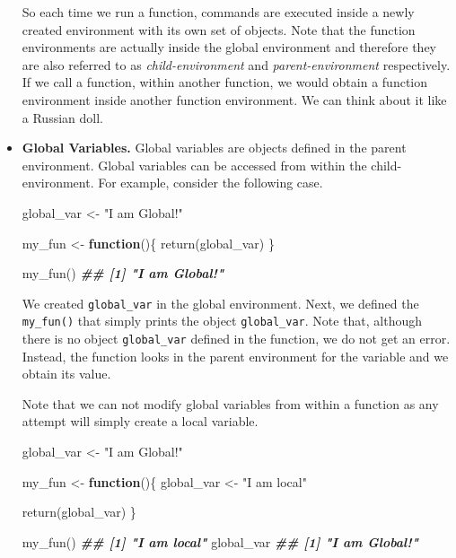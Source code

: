 \documentclass[
  11pt,
]{book}
\newenvironment{Shaded}{\begin{snugshade}}{\end{snugshade}}
\newcommand{\ControlFlowTok}[1]{\textcolor[rgb]{0.13,0.29,0.53}{\textbf{#1}}}
\newcommand{\DocumentationTok}[1]{\textcolor[rgb]{0.56,0.35,0.01}{\textbf{\textit{#1}}}}
\newcommand{\FunctionTok}[1]{\textcolor[rgb]{0.00,0.00,0.00}{#1}}
\newcommand{\NormalTok}[1]{#1}
\newcommand{\OtherTok}[1]{\textcolor[rgb]{0.56,0.35,0.01}{#1}}
\newcommand{\StringTok}[1]{\textcolor[rgb]{0.31,0.60,0.02}{#1}}
\begin{document}
\begin{itemize}
  So each time we run a function, commands are executed inside a newly created environment with its own set of objects. Note that the function environments are actually inside the global environment and therefore they are also referred to as \emph{child-environment} and \emph{parent-environment} respectively. If we call a function, within another function, we would obtain a function environment inside another function environment. We can think about it like a Russian doll.
\item
  \textbf{Global Variables.} Global variables are objects defined in the parent environment. Global variables can be accessed from within the child-environment. For example, consider the following case.

\begin{Shaded}
\begin{Highlighting}[]
\NormalTok{global\_var }\OtherTok{\textless{}{-}} \StringTok{"I am Global!"}

\NormalTok{my\_fun }\OtherTok{\textless{}{-}} \ControlFlowTok{function}\NormalTok{()\{}
  \FunctionTok{return}\NormalTok{(global\_var)}
\NormalTok{\}}

\FunctionTok{my\_fun}\NormalTok{()}
\DocumentationTok{\#\# [1] "I am Global!"}
\end{Highlighting}
\end{Shaded}

  We created \texttt{global\_var} in the global environment. Next, we defined the \texttt{my\_fun()} that simply prints the object \texttt{global\_var}. Note that, although there is no object \texttt{global\_var} defined in the function, we do not get an error. Instead, the function looks in the parent environment for the variable and we obtain its value.

  Note that we can not modify global variables from within a function as any attempt will simply create a local variable.

\begin{Shaded}
\begin{Highlighting}[]
\NormalTok{global\_var }\OtherTok{\textless{}{-}} \StringTok{"I am Global!"}

\NormalTok{my\_fun }\OtherTok{\textless{}{-}} \ControlFlowTok{function}\NormalTok{()\{}
\NormalTok{  global\_var }\OtherTok{\textless{}{-}} \StringTok{"I am local"}

  \FunctionTok{return}\NormalTok{(global\_var)}
\NormalTok{\}}

\FunctionTok{my\_fun}\NormalTok{()}
\DocumentationTok{\#\# [1] "I am local"}
\NormalTok{global\_var}
\DocumentationTok{\#\# [1] "I am Global!"}
\end{Highlighting}
\end{Shaded}


\end{itemize}
\end{document}
